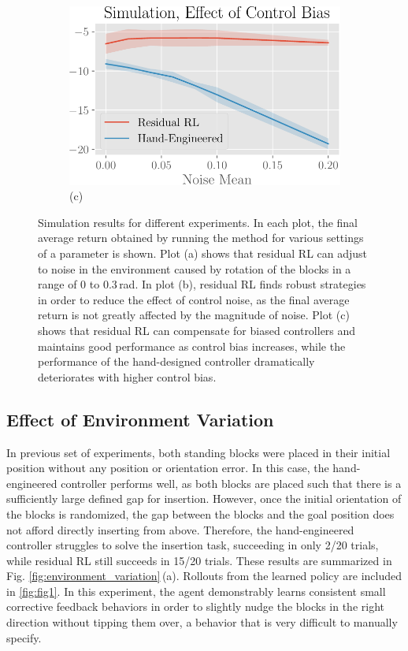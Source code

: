 \begin{figure}[t]
\begin{subfigure}[b]{0.32\linewidth}
        \includegraphics[width=0.99\linewidth]{residualrl/figs/control_bias_sim.pdf} \\
        \centering
        (c)
    \end{subfigure}
    \caption{Simulation results for different experiments. In each plot, the final average return obtained by running the method for various settings of a parameter is shown. Plot (a) shows that residual RL can adjust to noise in the environment caused by rotation of the blocks in a range of $0$ to $0.3$\,rad. In plot (b), residual RL finds robust strategies in order to reduce the effect of control noise, as the final average return is not greatly affected by the magnitude of noise. Plot (c) shows that residual RL can compensate for biased controllers and maintains good performance as control bias increases, while the performance of the hand-designed controller dramatically deteriorates with higher control bias.} %
    \label{fig:control_bias}
\end{figure}

\subsection{Effect of Environment Variation}

In previous set of experiments, both standing blocks were placed in their initial position without any position or orientation error. 
In this case, the hand-engineered controller performs well, as both blocks are placed such that there is a sufficiently large defined gap for insertion. 
However, once the initial orientation of the blocks is randomized, the gap between the blocks and the goal position does not afford directly inserting from above.
Therefore, the hand-engineered controller struggles to solve the insertion task, succeeding in only 2/20 trials, while residual RL still succeeds in 15/20 trials. These results are summarized in Fig. \ref{fig:environment_variation}\,(a). Rollouts from the learned policy are included in \ref{fig:fig1}. In this experiment, the agent demonstrably learns consistent small corrective feedback behaviors in order to slightly nudge the blocks in the right direction without tipping them over, a behavior that is very difficult to manually specify.

